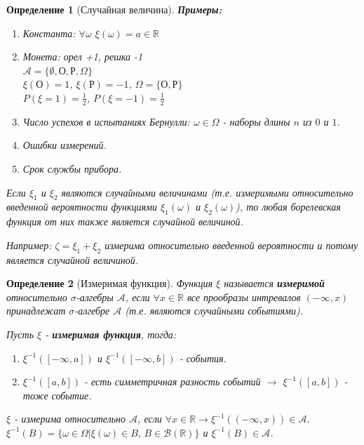 \documentclass[14pt]{extarticle}
\theoremstyle{breakstyle}
\newtheorem{definition}{Определение}[subsection]
\begin{document}
\begin{definition}[Случайная величина]
\textbf{Примеры:}
\begin{enumerate}
    \item Константа: $\forall \omega$ $\xi(\omega) = a \in \mathbb{R}$
    \item Монета: орел +1, решка -1 \\
          $\mathscr{A} = \{\emptyset, \text{О}, \text{Р}, \Omega\}$ \\
          $\xi(\text{О}) = 1$, $\xi(\text{Р}) = -1$, $\Omega = \{\text{О}, \text{Р}\}$ \\
          $P(\xi = 1) = \frac{1}{2}$, $P(\xi = -1) = \frac{1}{2}$
    \item Число успехов в испытаниях Бернулли: $\omega \in \Omega$ - наборы длины $n$ из $0$ и $1$.
    \item Ошибки измерений.
    \item Срок службы прибора.
\end{enumerate}

\vspace{\baselineskip}

Если $\xi_{1}$ и $\xi_{2}$ являются случайными величинами (т.е. измеримыми относительно введенной вероятности функциями $\xi_{1}(\omega)$ и $\xi_{2}(\omega)$), то любая борелевская функция от них также является случайной величиной.

\vspace{\baselineskip}

Например: $\zeta = \xi_{1} + \xi_{2}$ измерима относительно введенной вероятности и потому является случайной величиной.

\end{definition}

\begin{definition}[Измеримая функция]

Функция $\xi$ называется \textbf{измеримой} относительно $\sigma$-алгебры $\mathscr{A}$, если $\forall x \in \mathbb{R}$ все прообразы интревалов $(-\infty, x)$ принадлежат $\sigma$-алгебре $\mathscr{A}$ (т.е. являются случайными событиями).

\vspace{\baselineskip}

Пусть $\xi$ - \textbf{измеримая функция}, тогда:
\begin{enumerate}
    \item $\xi^{-1}([-\infty, a])$ и $\xi^{-1}([-\infty, b])$ - события.
    \item $\xi^{-1}([a, b])$ - есть симметричная разность событий $\rightarrow$ $\xi^{-1}([a, b])$ - тоже событие.
\end{enumerate}

\vspace{\baselineskip}

$\xi$ - измерима относительно $\mathscr{A}$, если $\forall x \in \mathbb{R} \rightarrow \xi^{-1}((-\infty, x)) \in \mathscr{A}$. \\
$\xi^{-1}(B) = \{\omega \in \Omega \text{|} \xi(\omega) \in B \text{, } B \in \mathscr{B(\mathbb{R})}\}$ и $\xi^{-1}(B) \in \mathscr{A}$.

\end{definition}
\end{document}
